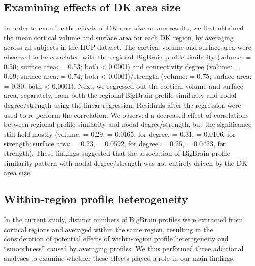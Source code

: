 \begin{refsection}
\subsection*{Examining effects of DK area size}
In order to examine the effects of DK area size on our results, we first obtained the mean cortical volume and surface area for each DK region, by averaging across all subjects in the HCP dataset. The cortical volume and surface area were observed to be correlated with the regional BigBrain profile similarity (volume: \rval = 0.50; surface area: \rval = 0.53; both \pval < 0.0001) and connectivity degree (volume: \rval = 0.69; surface area: \rval = 0.74; both \pval < 0.0001)/strength (volume: \rval = 0.75; surface area: \rval = 0.80; both \pval < 0.0001). Next, we regressed out the cortical volume and surface area, separately, from both the regional BigBrain profile similarity and nodal degree/strength using the linear regression. Residuals after the regression were used to re-perform the correlation. We observed a decreased effect of correlations between regional profile similarity and nodal degree/strength, but the significance still held mostly (volume: \rval = 0.29, \pval = 0.0165, for degree; \rval = 0.31, \pval = 0.0106, for strength; surface area: \rval = 0.23, \pval = 0.0592, for degree; \rval = 0.25, \pval = 0.0423, for strength). These findings suggested that the association of BigBrain profile similarity pattern with nodal degree/strength was not entirely driven by the DK area size.

\subsection*{Within-region profile heterogeneity}
In the current study, distinct numbers of BigBrain profiles were extracted from cortical regions and averaged within the same region, resulting in the consideration of potential effects of within-region profile heterogeneity and “smoothness” caused by averaging profiles. We thus performed three additional analyses to examine whether these effects played a role in our main findings.


\end{refsection}
